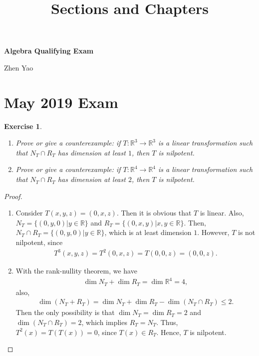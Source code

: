 \documentclass[11pt]{article}
\title{Sections and Chapters}
\newtheorem{exercise}{Exercise}[section]
\theoremstyle{definition}
\numberwithin{equation}{subsection}
\begin{document}
\centerline{\Large \bf Algebra Qualifying Exam}
\centerline{Zhen Yao}

\bigskip

\section{May 2019 Exam}

\begin{exercise}\label{May_2019_1}
~\begin{enumerate}[label=(\alph*)]
    \item Prove or give a counterexample: if $T: \mathbb{R}^3 \to \mathbb{R}^3$ is a linear transformation such that $N_T \cap R_T$ has dimension at least $1$, then $T$ is nilpotent. 
    
    \item Prove or give a counterexample: if $T: \mathbb{R}^4 \to \mathbb{R}^4$ is a linear transformation such that $N_T \cap R_T$ has dimension at least $2$, then $T$ is nilpotent. 
\end{enumerate}
\end{exercise}
\begin{proof}
~\begin{enumerate}[label=(\alph*)]
    \item Consider $T(x,y,z) = (0,x,z)$\cite{1}. Then it is obvious that $T$ is linear. Also, $N_T = \{(0,y,0)| y \in \mathbb{R}\}$ and $R_T = \{(0,x,y)| x,y \in \mathbb{R}\}$. Then, $N_T \cap R_T = \{(0,y,0)| y \in \mathbb{R}\}$, which is at least dimension $1$. However, $T$ is not nilpotent, since 
    \begin{align*}
        T^3(x,y,z) = T^2(0,x,z) = T(0,0,z) = (0,0,z).
    \end{align*}
    
    \item With the rank-nullity theorem, we have 
    \begin{align*}
        \dim N_T + \dim R_T = \dim \mathbb{R}^4 = 4,
    \end{align*}
    also, 
    \begin{align*}
        \dim (N_T + R_T) = \dim N_T + \dim R_T - \dim (N_T \cap R_T) \leq 2.
    \end{align*}
    Then the only possibility is that $\dim N_T = \dim R_T = 2$ and $\dim (N_T \cap R_T) = 2$, which implies $R_T = N_T$\cite{2}. Thus, $T^2(x) = T(T(x)) = 0$, since $T(x) \in R_T$. Hence, $T$ is nilpotent.
\end{enumerate}
\end{proof}
\end{document}
